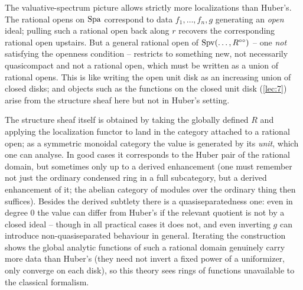 \begin{remark}
\label{rmk:9:more-than-huber}
The valuative-spectrum picture allows strictly more localizations than Huber's.
The rational opens on $\operatorname{Spa}$ correspond to data $f_{1},\dots,f_{n},g$ generating
an \emph{open} ideal; pulling such a rational open back along $r$ recovers the
corresponding rational open upstairs. But a general rational open of
$\operatorname{Spv}(\dots,R^{\circ\circ})$ -- one \emph{not} satisfying the openness
condition -- restricts to something new, not necessarily quasicompact and not a
rational open, which must be written as a union of rational opens. This is like
writing the open unit disk as an increasing union of closed disks; and objects
such as the functions on the closed unit disk (\cref{lec:7}) arise from the
structure sheaf here but not in Huber's setting.

The structure sheaf itself is obtained by taking the globally defined $R$ and
applying the localization functor to land in the category attached to a rational
open; as a symmetric monoidal category the value is generated by its \emph{unit},
which one can analyse. In good cases it corresponds to the Huber pair of the
rational domain, but sometimes only up to a derived enhancement (one must
remember not just the ordinary condensed ring in a full subcategory, but a
derived enhancement of it; the abelian category of modules over the ordinary
thing then suffices). Besides the derived subtlety there is a
quasiseparatedness one: even in degree $0$ the value can differ from Huber's if
the relevant quotient is not by a closed ideal -- though in all practical cases
it does not, and even inverting $g$ can introduce non-quasiseparated behaviour in
general. Iterating the construction shows the global analytic functions of such a
rational domain genuinely carry more data than Huber's (they need not invert a
fixed power of a uniformizer, only converge on each disk), so this theory sees
rings of functions unavailable to the classical formalism.
\end{remark}
